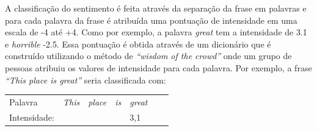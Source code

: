 A classificação do sentimento é feita através da separação da frase em palavras
e para cada palavra da frase é atribuída uma pontuação de intensidade em uma
escala de -4 até +4. Como por exemplo, a palavra \textit{great} tem a
intensidade de 3.1 e \textit{horrible} -2.5. Essa pontuação é obtida através de
um dicionário que é construído utilizando o método de \textit{``wisdom of the
crowd''} onde um grupo de pessoas atribuiu os valores de intensidade para cada palavra. Por
exemplo, a frase \textit{``This place is great''} seria classificada com:


\begin{table}[htb]
\centering
\begin{tabular}{l|l|l|l|l|l|l}
Palavra         & \textit{This}        & \textit{place} & \textit{is}      &
\textit{great}
\\
Intensidade:   &  &   &  & 3,1
\end{tabular}
\label{my-label}
\end{table}

